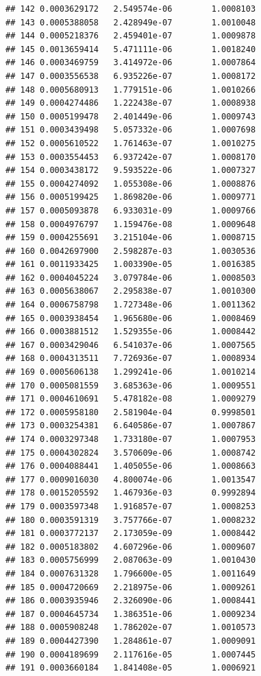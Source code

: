 \documentclass{article}\usepackage[]{graphicx}\usepackage[]{xcolor}
\makeatletter
\newenvironment{kframe}{%
 \def\at@end@of@kframe{}%
 \ifinner\ifhmode%
  \def\at@end@of@kframe{\end{minipage}}%
  \begin{minipage}{\columnwidth}%
 \fi\fi%
 \def\FrameCommand##1{\hskip\@totalleftmargin \hskip-\fboxsep
 \colorbox{shadecolor}{##1}\hskip-\fboxsep
     \hskip-\linewidth \hskip-\@totalleftmargin \hskip\columnwidth}%
 \MakeFramed {\advance\hsize-\width
   \@totalleftmargin\z@ \linewidth\hsize
   \@setminipage}}%
 {\par\unskip\endMakeFramed%
 \at@end@of@kframe}
\newenvironment{knitrout}{}{} %
\makeatother
\begin{document}
\begin{knitrout}
\begin{kframe}
\begin{verbatim}
## 142 0.0003629172   2.549574e-06        1.0008103
## 143 0.0005388058   2.428949e-07        1.0010048
## 144 0.0005218376   2.459401e-07        1.0009878
## 145 0.0013659414   5.471111e-06        1.0018240
## 146 0.0003469759   3.414972e-06        1.0007864
## 147 0.0003556538   6.935226e-07        1.0008172
## 148 0.0005680913   1.779151e-06        1.0010266
## 149 0.0004274486   1.222438e-07        1.0008938
## 150 0.0005199478   2.401449e-06        1.0009743
## 151 0.0003439498   5.057332e-06        1.0007698
## 152 0.0005610522   1.761463e-07        1.0010275
## 153 0.0003554453   6.937242e-07        1.0008170
## 154 0.0003438172   9.593522e-06        1.0007327
## 155 0.0004274092   1.055308e-06        1.0008876
## 156 0.0005199425   1.869820e-06        1.0009771
## 157 0.0005093878   6.933031e-09        1.0009766
## 158 0.0004976797   1.159476e-08        1.0009648
## 159 0.0004255691   3.215104e-06        1.0008715
## 160 0.0042697900   2.598287e-03        1.0030536
## 161 0.0011933425   1.003390e-05        1.0016385
## 162 0.0004045224   3.079784e-06        1.0008503
## 163 0.0005638067   2.295838e-07        1.0010300
## 164 0.0006758798   1.727348e-06        1.0011362
## 165 0.0003938454   1.965680e-06        1.0008469
## 166 0.0003881512   1.529355e-06        1.0008442
## 167 0.0003429046   6.541037e-06        1.0007565
## 168 0.0004313511   7.726936e-07        1.0008934
## 169 0.0005606138   1.299241e-06        1.0010214
## 170 0.0005081559   3.685363e-06        1.0009551
## 171 0.0004610691   5.478182e-08        1.0009279
## 172 0.0005958180   2.581904e-04        0.9998501
## 173 0.0003254381   6.640586e-07        1.0007867
## 174 0.0003297348   1.733180e-07        1.0007953
## 175 0.0004302824   3.570609e-06        1.0008742
## 176 0.0004088441   1.405055e-06        1.0008663
## 177 0.0009016030   4.800074e-06        1.0013547
## 178 0.0015205592   1.467936e-03        0.9992894
## 179 0.0003597348   1.916857e-07        1.0008253
## 180 0.0003591319   3.757766e-07        1.0008232
## 181 0.0003772137   2.173059e-09        1.0008442
## 182 0.0005183802   4.607296e-06        1.0009607
## 183 0.0005756999   2.087063e-09        1.0010430
## 184 0.0007631328   1.796600e-05        1.0011649
## 185 0.0004720669   2.218975e-06        1.0009261
## 186 0.0003935946   2.326090e-06        1.0008441
## 187 0.0004645734   1.386351e-06        1.0009234
## 188 0.0005908248   1.786202e-07        1.0010573
## 189 0.0004427390   1.284861e-07        1.0009091
## 190 0.0004189699   2.117616e-05        1.0007445
## 191 0.0003660184   1.841408e-05        1.0006921

\end{verbatim}
\end{kframe}
\end{knitrout}
\end{document}
